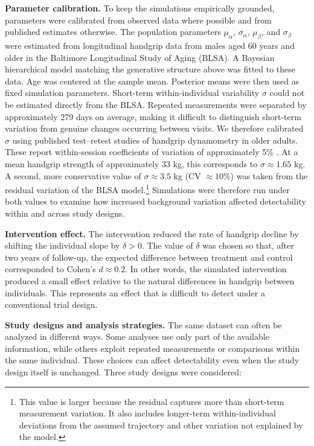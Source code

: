 \documentclass[twocolumn]{article} %
\begin{document}
\textbf{Parameter calibration.} To keep the simulations empirically grounded, parameters were calibrated from observed data where possible and from published estimates otherwise. The population parameters $\mu_\alpha$, $\sigma_\alpha$, $\mu_\beta$, and $\sigma_\beta$ were estimated from longitudinal handgrip data from males aged 60 years and older in the Baltimore Longitudinal Study of Aging (BLSA). A Bayesian hierarchical model matching the generative structure above was fitted to these data. Age was centered at the sample mean. Posterior means were then used as fixed simulation parameters. Short-term within-individual variability $\sigma$ could not be estimated directly from the BLSA. Repeated measurements were separated by approximately 279 days on average, making it difficult to distinguish short-term variation from genuine changes occurring between visits. We therefore calibrated $\sigma$ using published test–retest studies of handgrip dynamometry in older adults. These report within-session coefficients of variation of approximately 5\% \cite{venegas2022test,nolan2020factors,bohannon2005test}. At a mean handgrip strength of approximately 33 kg, this corresponds to $\sigma \approx 1.65$ kg. A second, more conservative value of $\sigma \approx 3.5$ kg (CV $\approx 10\%$) was taken from the residual variation of the BLSA model.\footnote{This value is larger because the residual captures more than short-term measurement variation. It also includes longer-term within-individual deviations from the assumed trajectory and other variation not explained by the model.} Simulations were therefore run under both values to examine how increased background variation affected detectability within and across study designs.

\textbf{Intervention effect.} The intervention reduced the rate of handgrip decline by shifting the individual slope by $\delta > 0$. The value of $\delta$ was chosen so that, after two years of follow-up, the expected difference between treatment and control corresponded to Cohen's $d \approx 0.2$. In other words, the simulated intervention produced a small effect relative to the natural differences in handgrip between individuals. This represents an effect that is difficult to detect under a conventional trial design.

\textbf{Study designs and analysis strategies.} The same dataset can often be analyzed in different ways. Some analyses use only part of the available information, while others exploit repeated measurements or comparisons within the same individual. These choices can affect detectability even when the study design itself is unchanged. Three study designs were considered:
\end{document}
